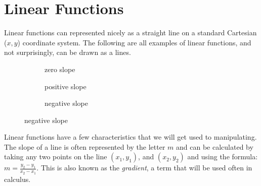 \section*{Linear Functions}
Linear functions can represented nicely as a straight line on a standard Cartesian ($x,y$) coordinate system. The following are all examples of linear functions, and not surprisingly, can be drawn as a lines.

\begin{figure}[H]
	\begin{subfigure}[b]{0.33\textwidth}
		\centering
		  \caption{zero slope}
	\end{subfigure}
	\begin{subfigure}[b]{0.33\textwidth}
		\centering
		  \caption{positive slope}
	\end{subfigure}
	\begin{subfigure}[b]{0.33\textwidth}
		\centering
		  \caption{negative slope}
	\end{subfigure}
\end{figure}

Linear functions have a few characteristics that we will get used to manipulating. The slope of a line is often represented by the letter $m$ and can be calculated by taking any two points on the line $(x_1,y_1)$, and $(x_2,y_2)$ and using the formula: $m =\frac{y_{2} -y_{1}}{x_{2} -x_{1}}$. This is also known as the \textit{gradient}, a term that will be used often in calculus.


